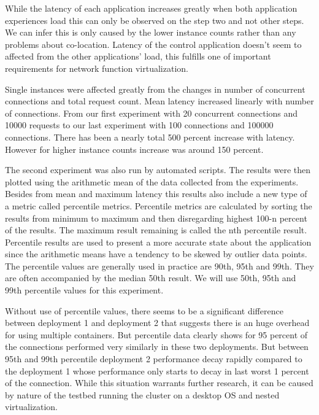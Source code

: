 \documentclass[12pt,oneandhalf,chaparabic,ceng,ms,eng,oneside,pntc]{gsufbe}
\begin{document}
While the latency of each application increases greatly when both application experiences load this can
only be observed on the step two and not other steps.  We can infer this is only caused by the lower
instance counts rather than any problems about co-location.  Latency of the control application doesn't
seem to affected from the other applications' load, this fulfills one of important requirements for
network function virtualization.

Single instances were affected greatly from the changes in number of concurrent connections and total
request count. Mean latency increased linearly with number of connections. From our first experiment
with 20 concurrent connections and 10000 requests to our last experiment with 100 connections and 
100000 connections. There has been a nearly total 500 percent increase with latency. However for higher
instance counts increase was around 150 percent.

The second experiment was also run by automated scripts.  The results were then plotted using the 
arithmetic mean of the data collected from the experiments. Besides from mean and maximum latency this
results also include a new type of a metric called percentile metrics. Percentile metrics are 
calculated by sorting the results from minimum to maximum and then disregarding highest 100-n
percent of the results. The maximum result remaining is called the nth percentile result. Percentile
results are used to present a more accurate state about the application since the arithmetic means have
a tendency to be skewed by outlier data points. The percentile values are generally used in practice
are 90th, 95th and 99th. They are often accompanied by the median 50th result. We will use 50th, 95th
and 99th percentile values for this experiment.

Without use of percentile values, there seems to be a significant difference between deployment 1 and
deployment 2 that suggests there is an huge overhead for using multiple containers. But percentile data
clearly shows for 95 percent of the connections performed very similarly in these two deployments.
But between 95th and 99th percentile deployment 2 performance decay rapidly compared to the deployment
1 whose performance only starts to decay in last worst 1 percent of the connection. While this 
situation warrants further research, it can be caused by nature of the testbed running the cluster on
a desktop OS and nested virtualization. 
\end{document}
